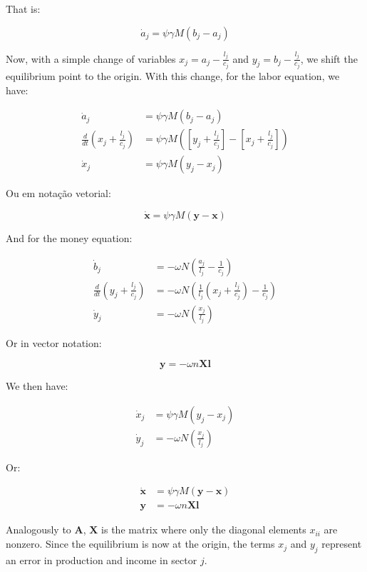 That is:

$$\dot{a}_{j}=\psi\gamma M\left(b_{j}-a_{j}\right)$$


Now, with a simple change of variables $x_{j}=a_{j}-\frac{l_{j}}{c_{j}}$ and $y_{j}=b_{j}-\frac{l_{j}}{c_{j}}$, we shift the equilibrium point to the origin. With this change, for the labor equation, we have:


\begin{align*}
\dot{a}_{j} & =\psi\gamma M\left(b_{j}-a_{j}\right)\\
\frac{d}{dt}\left(x_{j}+\frac{l_{j}}{c_{j}}\right) & =\psi\gamma M\left(\left[y_{j}+\frac{l_{j}}{c_{j}}\right]-\left[x_{j}+\frac{l_{j}}{c_{j}}\right]\right)\\
\dot{x}_{j} & =\psi\gamma M\left(y_{j}-x_{j}\right)
\end{align*}

Ou em notação vetorial:

$$
\dot{\boldsymbol{x}}=\psi\gamma M\left(\boldsymbol{y}-\boldsymbol{x}\right)
$$

And for the money equation:

\begin{align*}
\dot{b}_{j} & =-\omega N\left(\frac{a_{j}}{l_{j}}-\frac{1}{c_{j}}\right)\\
\frac{d}{dt}\left(y_{j}+\frac{l_{j}}{c_{j}}\right) & =-\omega N\left(\frac{1}{l_{j}}\left(x_{j}+\frac{l_{j}}{c_{j}}\right)-\frac{1}{c_{j}}\right)\\
\dot{y}_{j} & =-\omega N\left(\frac{x_{j}}{l_{j}}\right)
\end{align*}

Or in vector notation:

$$
\boldsymbol{y}=-\omega n\boldsymbol{X}\boldsymbol{l}
$$

We then have:


\begin{align*}
\dot{x}_{j} & =\psi\gamma M\left(y_{j}-x_{j}\right)\\
\dot{y}_{j} & =-\omega N\left(\frac{x_{j}}{l_{j}}\right)
\end{align*}

Or:

\begin{align*}
\dot{\boldsymbol{x}} & =\psi\gamma M\left(\boldsymbol{y}-\boldsymbol{x}\right)\\
\boldsymbol{y} & =-\omega n\boldsymbol{X}\boldsymbol{l}
\end{align*}

Analogously to $\boldsymbol{A}$, $\boldsymbol{X}$ is the matrix where only the diagonal elements $x_{ii}$ are nonzero. Since the equilibrium is now at the origin, the terms $x_{j}$ and $y_{j}$ represent an error in production and income in sector $j$.  

